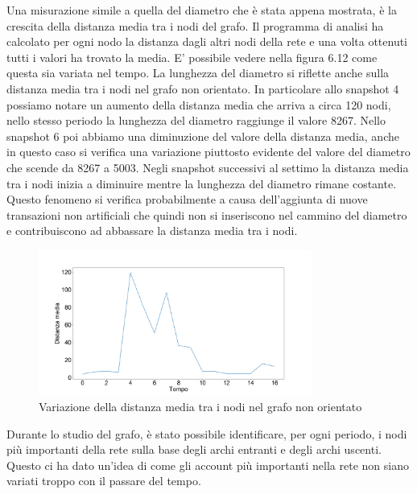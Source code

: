 \documentclass[12pt]{report}
\begin{document}
Una misurazione simile a quella del diametro che è stata appena mostrata, è la crescita della distanza media tra i nodi del grafo.
Il programma di analisi ha calcolato per ogni nodo la distanza dagli altri nodi della rete e una volta ottenuti tutti i valori ha trovato la media.
E' possibile vedere nella figura 6.12 come questa sia variata nel tempo.
La lunghezza del diametro si riflette anche sulla distanza media tra i nodi nel grafo non orientato. 
In particolare allo snapshot 4 possiamo notare un aumento della distanza media che arriva a circa 120 nodi, nello stesso periodo la lunghezza del diametro raggiunge il valore 8267.
Nello snapshot 6 poi abbiamo una diminuzione del valore della distanza media, anche in questo caso si verifica una variazione piuttosto evidente del valore del diametro che scende da 8267 a 5003.
Negli snapshot successivi al settimo la distanza media tra i nodi inizia a diminuire mentre la lunghezza del diametro rimane costante. 
Questo fenomeno si verifica probabilmente a causa dell'aggiunta di nuove transazioni non artificiali che quindi non si inseriscono nel cammino del diametro e contribuiscono ad abbassare la distanza media tra i nodi.

\begin{figure}[H]
    \centering\includegraphics[width=0.8\textwidth]{DistanzaMedia.png}
    \caption{Variazione della distanza media tra i nodi nel grafo non orientato}
\end{figure}


Durante lo studio del grafo, è stato possibile identificare, per ogni periodo, i nodi più importanti della rete sulla base degli archi entranti e degli archi uscenti.
Questo ci ha dato un'idea di come gli account più importanti nella rete non siano variati troppo con il passare del tempo.
\end{document}

